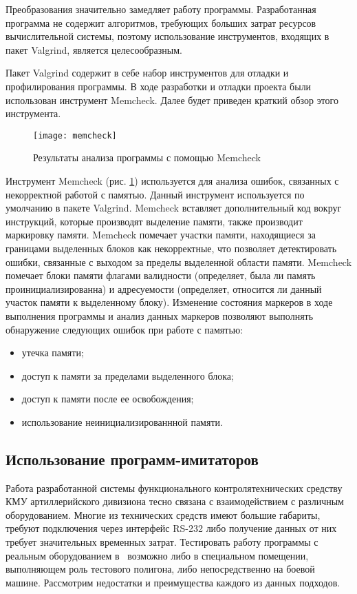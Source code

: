 Преобразования значительно замедляет работу программы. Разработанная программа не содержит алгоритмов, требующих больших
затрат ресурсов вычислительной системы, поэтому использование инструментов, входящих в пакет Valgrind, является
целесообразным.

Пакет Valgrind содержит в себе набор инструментов для отладки и профилирования программы. В ходе разработки и отладки
проекта были использован инструмент Memcheck. Далее будет приведен краткий обзор этого инструмента.
\begin{figure}[htb]
	\centering
	\texttt{[image: memcheck]}
	\caption{Результаты анализа программы с помощью Memcheck}
	\label{fig:test:valgrind:memcheck}
\end{figure}

Инструмент Memcheck (рис. \ref{fig:test:valgrind:memcheck}) используется для анализа ошибок, связанных с некорректной работой с памятью. Данный инструмент
используется по умолчанию в пакете Valgrind. Memcheck вставляет дополнительный код вокруг инструкций, которые
производят выделение памяти, также производит маркировку памяти. Memcheck помечает участки памяти, находящиеся за
границами выделенных блоков как некорректные, что позволяет детектировать ошибки, связанные с выходом за пределы
выделенной области памяти. Memcheck помечает блоки памяти флагами валидности (определяет, была ли память
проинициализированна) и адресуемости (определяет, относится ли данный участок памяти к выделенному блоку). Изменение состояния маркеров в ходе выполнения программы и
анализ данных маркеров позволяют выполнять обнаружение следующих ошибок при работе с памятью:
\begin{itemize}
	\item утечка памяти;
	\item доступ к памяти за пределами выделенного блока;
	\item доступ к памяти после ее освобождения;
	\item использование неинициализированнной памяти.
\end{itemize}

\subsection{Использование программ-имитаторов}
Работа разработанной системы функционального контроля\break технических средству КМУ артиллерийского дивизиона тесно связана с
взаимодействием с различным оборудованием. Многие из технических средств имеют большие габариты, требуют подключения
через интерфейс RS-232 либо получение данных от них требует значительных временных затрат. Тестировать работу программы
с реальным оборудованием в \company~возможно либо в специальном помещении, выполняющем роль тестового полигона, либо
непосредственно на боевой машине. Рассмотрим недостатки и преимущества каждого из данных подходов.

